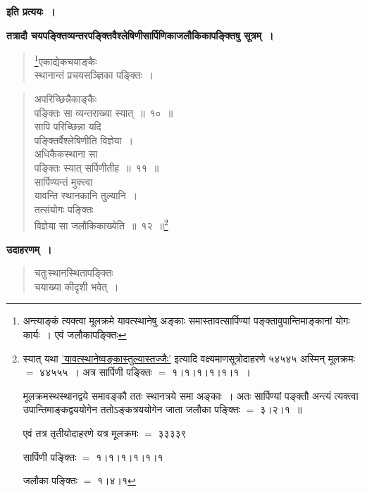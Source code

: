 \documentclass[11pt, openany]{book}
\begin{document}
\begin{center}
\textbf{इति प्रत्ययः~।}
\end{center} 

\textbf{तत्रादौ चयपङ्क्तिव्यन्तरपङ्क्तिवैश्लेषिणीसार्पिणिकाजलौकिकापङ्क्तिषु सूत्रम्~।}

 \label{13.10}
\begin{quote}
\renewcommand{\thefootnote}{*}\footnote{अन्त्याङ्कं त्यक्त्वा मूलक्रमे यावत्स्थानेषु अङ्काः समास्तावत्सार्पिण्यां पङ्क्तावुपान्तिमाङ्कानां योगः कार्यः~। एवं जलौकापङ्क्तिः}{\gk एकाद्येकचयाङ्कैः\\
स्थानान्तं प्रचयसञ्ज्ञिका पङ्क्तिः~।}
\end{quote}

\newpage

\begin{quote}
{\gk अपरिच्छिन्नैकाङ्कैः\\
पङ्क्तिः सा व्यन्तराख्या स्यात्~॥~१०~॥\\
सापि परिच्छिन्ना यदि\\
पङ्क्तिर्वैश्लेषिणीति विज्ञेया~।\\
अधिकैकस्थाना सा\\
पङ्क्तिः स्यात् सर्पिणीतीह~॥~११~॥\\
सार्पिण्यन्तं मुक्त्त्वा\\
यावन्ति स्थानकानि तुल्यानि~।\\
तत्संयोगः पङ्क्तिः\\
विज्ञेया सा जलौकिकाख्येति~॥~१२~॥}\renewcommand{\thefootnote}{}\footnote{\hspace{-8.5mm} स्यात् यथा \hyperref[13.55]{'यावत्स्थानेष्वङ्कास्तुल्यास्तज्जैः'} इत्यादि वक्ष्यमाणसूत्रोदाहरणे ५४५४५ अस्मिन् मूलक्रमः $=$ ४४५५५~। अत्र सार्पिणी पङ्क्तिः $=$ १।१।१।१।१।१~। 
\vspace{1mm}

मूलक्रमस्थस्थानद्वये समावङ्कौ ततः स्थानत्रये समा अङ्काः~। अतः सार्पिण्यां पङ्क्तौ अन्त्यं त्यक्त्वा उपान्तिमाङ्कद्वययोगेन ततोऽङ्कत्रययोगेन जाता जलौका पङ्क्तिः $=$ ३।२।१~॥ 
\vspace{1mm}

एवं तत्र तृतीयोदाहरणे यत्र मूलक्रमः $=$ ३३३३९ 
\vspace{1mm}

सार्पिणी पङ्क्तिः $=$ १।१।१।१।१।१
\vspace{1mm}

जलौका पङ्क्तिः $=$ १।४।१}
\end{quote}

\textbf{उदाहरणम्~।}
 
\begin{quote}
{\ex चतुःस्थानस्थितापङ्क्तिः\\
चयाख्या कीदृशी भवेत्~।}	
\end{quote}
\end{document}
